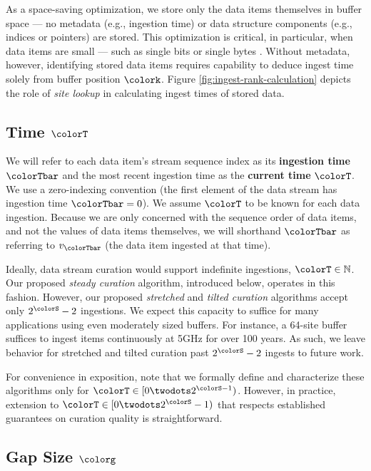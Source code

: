 As a space-saving optimization, we store only the data items themselves in buffer space --- no metadata (e.g., ingestion time) or data structure components (e.g., indices or pointers) are stored.
This optimization is critical, in particular, when data items are small --- such as single bits or single bytes \citep{moreno2022hereditary}.
Without metadata, however, identifying stored data items requires capability to deduce ingest time solely from buffer position $\colork$.
Figure \ref{fig:ingest-rank-calculation} depicts the role of \textit{site lookup} in calculating ingest times of stored data.

\subsection{Time $\colorT$}
\label{sec:notation-time}

We will refer to each data item's stream sequence index as its \textbf{ingestion time} $\colorTbar$ and the most recent ingestion time as the \textbf{current time} $\colorT$.
We use a zero-indexing convention (the first element of the data stream has ingestion time $\colorTbar=0$).
We assume $\colorT$ to be known for each data ingestion.
Because we are only concerned with the sequence order of data items, and not the values of data items themselves, we will shorthand $\colorTbar$ as referring to $v_{\colorTbar}$ (the data item ingested at that time).

Ideally, data stream curation would support indefinite ingestions, $\colorT \in \mathbb{N}$.
Our proposed \textit{steady curation} algorithm, introduced below, operates in this fashion.
However, our proposed \textit{stretched} and \textit{tilted curation} algorithms accept only $2^{\colorS} - 2$ ingestions.
We expect this capacity to suffice for many applications using even moderately sized buffers.
For instance, a 64-site buffer suffices to ingest items continuously at 5GHz for over 100 years.
As such, we leave behavior for stretched and tilted curation past $2^{\colorS} - 2$ ingests to future work.

For convenience in exposition, note that we formally define and characterize these algorithms only for $\colorT \in [0 \twodots 2^{\colorS - 1})$.
However, in practice, extension to $\colorT \in [0 \twodots 2^{\colorS} - 1)$ that respects established guarantees on curation quality is straightforward.

\subsection{Gap Size $\colorg$}
\label{sec:notation-gapsize}

